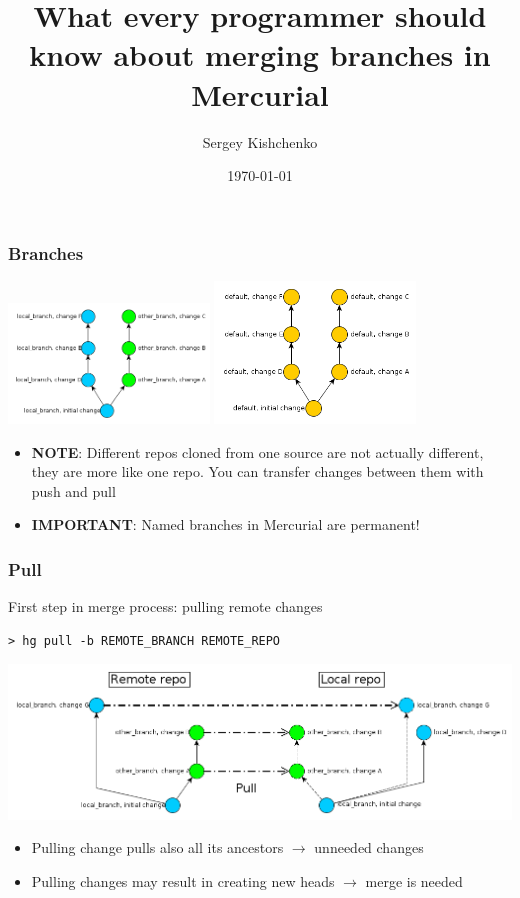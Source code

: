 \documentclass{beamer}
\title{What every programmer should know about merging branches in Mercurial}
\author{Sergey Kishchenko}
\date{\today}
\institute{Quickoffice}
\begin{document}
\frame{\titlepage}

\begin{frame} 
\frametitle{Branches}
\begin{multicols}{2}
\includegraphics[width=0.4\textwidth]{img/two_branches}
\columnbreak
{}
\includegraphics[width=0.4\textwidth]{img/two_default_branches}
\end{multicols}
\begin{itemize}
\item \textbf{NOTE}: Different repos cloned from one source are not actually different, they are more like one repo. You can transfer changes between them with push and pull
\item \textbf{IMPORTANT}: Named branches in Mercurial are permanent!
\end{itemize}
\end{frame}

\begin{frame}[fragile]
\frametitle{Pull}
\begin{exampleblock}{First step in merge process: pulling remote changes}
\begin{verbatim}
> hg pull -b REMOTE_BRANCH REMOTE_REPO
\end{verbatim}
\end{exampleblock}
\includegraphics[width=\textwidth]{img/pull_branches}
\begin{itemize}
\item Pulling change pulls also all its ancestors $\to$ unneeded changes
\item Pulling changes may result in creating new heads $\to$ merge is needed
\end{itemize}
\end{frame}
\end{document}
